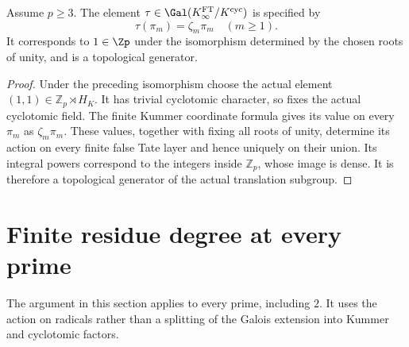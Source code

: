 \begin{definition}
\label{ft:tau}
\leanok
{}
Assume $p\geq3$. The element $\tau\in\Gal(K^{\mathrm{FT}}_\infty/K^{\mathrm{cyc}})$
is specified by
\[
 \tau(\pi_m)=\zeta_m\pi_m\quad(m\geq1).
\]
It corresponds to $1\in\Zp$ under the isomorphism determined by the
chosen roots of unity, and is a topological generator.
\end{definition}
\begin{proof}
Under the preceding isomorphism choose the actual element
$(1,1)\in\mathbb Z_p\rtimes H_K$. It has trivial cyclotomic
character, so fixes the actual cyclotomic field.
The finite Kummer coordinate formula gives its value on every
$\pi_m$ as $\zeta_m\pi_m$.
These values, together with fixing all roots of unity, determine
its action on every finite false Tate layer and hence uniquely
on their union. Its integral powers correspond to the integers
inside $\mathbb Z_p$, whose image is dense. It is therefore a
topological generator of the actual translation subgroup.
\end{proof}


\section{Finite residue degree at every prime}

The argument in this section applies to every prime, including $2$.
It uses the action on radicals rather than a splitting of the Galois
extension into Kummer and cyclotomic factors.

